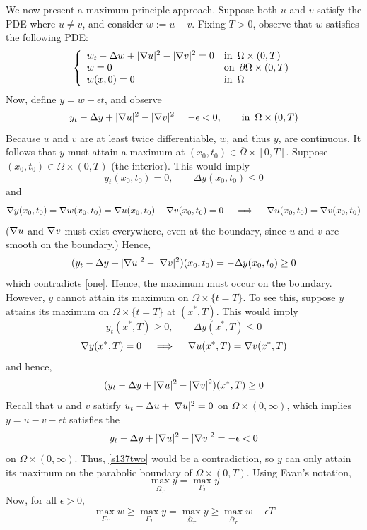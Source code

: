We now present a maximum principle approach.
Suppose both $u$ and $v$ satisfy the PDE where $u \neq v$, and consider $w := u-v$. Fixing $T > 0$, observe that $w$ satisfies the following PDE:
\[
\left\{
\begin{array}{ll}
	w_t - \Delta w + |\nabla u|^2 - |\nabla v|^2 = 0 & \text{in} \,\,\, \Omega \times (0,T)\\
	w = 0 & \text{on} \,\,\, \partial \Omega \times (0,T) \\
	w(x,0) = 0 & \text{in} \,\,\, \Omega
\end{array}
\right.
\]
Now, define $y = w - \epsilon t$, and observe
\begin{equation}
\label{one}
	y_t - \Delta y + |\nabla u|^2 - |\nabla v|^2 = - \epsilon < 0, \quad \quad \text{in} \,\,\, \Omega \times (0,T)
\end{equation}
Because $u$ and $v$ are at least twice differentiable, $w$, and thus $y$, are continuous. It follows that $y$ must attain a maximum at $(x_0,t_0) \in \overline{\Omega} \times [0,T]$. Suppose $(x_0,t_0) \in \Omega \times (0,T)$ (the interior). This would imply
$$y_t(x_0,t_0) = 0, \quad \quad \Delta y(x_0,t_0) \leq 0$$
and
$$\nabla y(x_0,t_0) = \nabla w(x_0,t_0) = \nabla u(x_0,t_0) - \nabla v(x_0,t_0) = 0 \quad \implies \quad \nabla u(x_0,t_0) = \nabla v(x_0,t_0) $$
($\nabla u$ and $\nabla v$ must exist everywhere, even at the boundary, since $u$ and $v$ are smooth on the boundary.) Hence,
$$ (y_t - \Delta y + |\nabla u|^2 - |\nabla v|^2)(x_0,t_0) = - \Delta y(x_0,t_0) \geq 0 $$
which contradicts \eqref{one}. Hence, the maximum must occur on the boundary. However, $y$ cannot attain its maximum on $\Omega \times \{t=T\}$. To see this, suppose $y$ attains its maximum on $\Omega \times \{t=T\}$ at $(x^*, T)$. This would imply
$$ y_t(x^*,T) \geq 0, \quad \quad \Delta y(x^*,T) \leq 0 $$
$$ \nabla y(x^*,T) = 0 \quad \implies \quad \nabla u(x^*,T) = \nabla v(x^*,T) $$
and hence,
\begin{equation}
\label{s137two}
	(y_t - \Delta y + |\nabla u|^2 - |\nabla v|^2)(x^*,T) \geq 0
\end{equation}
Recall that $u$ and $v$ satisfy $u_t - \Delta u + |\nabla u|^2 = 0$ on $\Omega \times (0,\infty)$, which implies $y = u - v - \epsilon t$ satisfies the
$$ y_t - \Delta y + |\nabla u|^2 - |\nabla v|^2 = - \epsilon < 0 $$
on $\Omega \times (0,\infty)$. Thus, \eqref{s137two} would be a contradiction, so $y$ can only attain its maximum on the parabolic boundary of $\Omega \times (0,T)$. Using Evan's notation,
$$ \max_{\bar{\Omega}_T} y = \max_{\Gamma_T} y $$
Now, for all $\epsilon > 0$,
$$ \max_{\Gamma_T} w \geq \max_{\Gamma_T} y = \max_{\bar{\Omega}_T} y \geq \max_{\bar{\Omega}_T} w - \epsilon T $$
